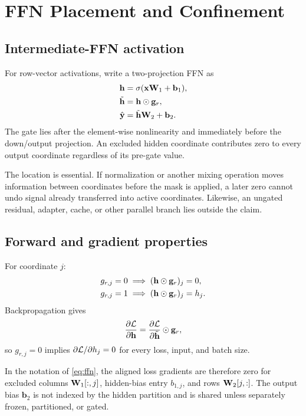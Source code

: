 \documentclass[11pt]{article}
\begin{document}
\section{FFN Placement and Confinement}

\subsection{Intermediate-FFN activation}

For row-vector activations, write a two-projection FFN as
\begin{align}
  \mathbf{h} &= \sigma(\mathbf{x}\mathbf{W}_1+\mathbf b_1), \\
  \tilde{\mathbf{h}} &= \mathbf{h}\odot\mathbf{g}_r, \\
  \hat{\mathbf y} &= \tilde{\mathbf{h}}\mathbf{W}_2+\mathbf b_2.
  \label{eq:ffn}
\end{align}
The gate lies after the element-wise nonlinearity and immediately before the
down/output projection. An excluded hidden coordinate contributes zero to every
output coordinate regardless of its pre-gate value.

The location is essential. If normalization or another mixing operation moves
information between coordinates before the mask is applied, a later zero cannot
undo signal already transferred into active coordinates. Likewise, an ungated
residual, adapter, cache, or other parallel branch lies outside the claim.

\subsection{Forward and gradient properties}

For coordinate $j$:
\begin{align}
g_{r,j}=0 &\implies (\mathbf{h}\odot\mathbf{g}_r)_j=0, \\
g_{r,j}=1 &\implies (\mathbf{h}\odot\mathbf{g}_r)_j=h_j.
\end{align}
Backpropagation gives
\begin{equation}
  \frac{\partial\mathcal{L}}{\partial\mathbf{h}}
  =\frac{\partial\mathcal{L}}{\partial\tilde{\mathbf{h}}}\odot\mathbf{g}_r,
  \label{eq:gradient}
\end{equation}
so $g_{r,j}=0$ implies $\partial\mathcal{L}/\partial h_j=0$ for every loss,
input, and batch size.

In the notation of \cref{eq:ffn}, the aligned loss gradients are therefore zero
for excluded columns $\mathbf{W}_1[:,j]$, hidden-bias entry $b_{1,j}$, and rows
$\mathbf{W}_2[j,:]$. The output bias $\mathbf b_2$ is not indexed by the hidden
partition and is shared unless separately frozen, partitioned, or gated.
\end{document}
